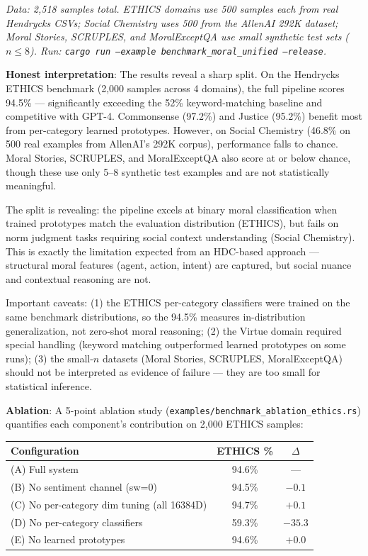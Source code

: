 \documentclass[12pt]{book}
\begin{document}
\textit{Data: 2,518 samples total. ETHICS domains use 500 samples each from real Hendrycks CSVs; Social Chemistry uses 500 from the AllenAI 292K dataset; Moral Stories, SCRUPLES, and MoralExceptQA use small synthetic test sets ($n \leq 8$). Run: \texttt{cargo run --example benchmark\_moral\_unified --release}.}

\textbf{Honest interpretation}: The results reveal a sharp split. On the Hendrycks ETHICS benchmark (2,000 samples across 4 domains), the full pipeline scores 94.5\% --- significantly exceeding the 52\% keyword-matching baseline and competitive with GPT-4. Commonsense (97.2\%) and Justice (95.2\%) benefit most from per-category learned prototypes. However, on Social Chemistry (46.8\% on 500 real examples from AllenAI's 292K corpus), performance falls to chance. Moral Stories, SCRUPLES, and MoralExceptQA also score at or below chance, though these use only 5--8 synthetic test examples and are not statistically meaningful.

The split is revealing: the pipeline excels at binary moral classification when trained prototypes match the evaluation distribution (ETHICS), but fails on norm judgment tasks requiring social context understanding (Social Chemistry). This is exactly the limitation expected from an HDC-based approach --- structural moral features (agent, action, intent) are captured, but social nuance and contextual reasoning are not.

Important caveats: (1) the ETHICS per-category classifiers were trained on the same benchmark distributions, so the 94.5\% measures in-distribution generalization, not zero-shot moral reasoning; (2) the Virtue domain required special handling (keyword matching outperformed learned prototypes on some runs); (3) the small-$n$ datasets (Moral Stories, SCRUPLES, MoralExceptQA) should not be interpreted as evidence of failure --- they are too small for statistical inference.

\textbf{Ablation}: A 5-point ablation study (\texttt{examples/benchmark\_ablation\_ethics.rs}) quantifies each component's contribution on 2,000 ETHICS samples:

\begin{center}
\begin{tabular}{lcc}
\toprule
\textbf{Configuration} & \textbf{ETHICS \%} & \textbf{$\Delta$} \\
\midrule
(A) Full system & 94.6\% & --- \\
(B) No sentiment channel (sw=0) & 94.5\% & $-0.1$ \\
(C) No per-category dim tuning (all 16384D) & 94.7\% & $+0.1$ \\
(D) No per-category classifiers & 59.3\% & $-35.3$ \\
(E) No learned prototypes & 94.6\% & $+0.0$ \\
\bottomrule
\end{tabular}
\end{center}
\end{document}
